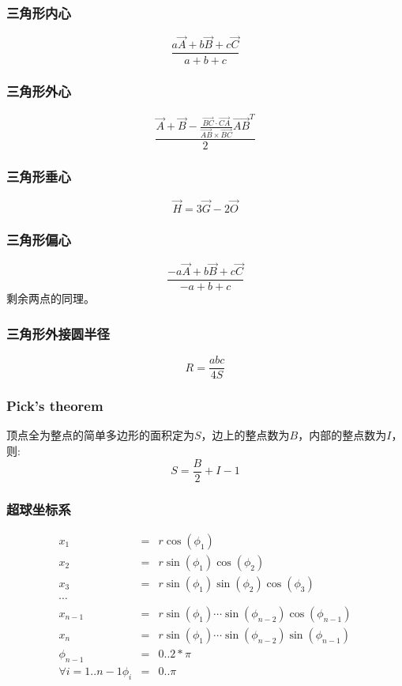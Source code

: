 \subsubsection{三角形内心}
	\[ \frac{a\vec {A} + b\vec{B} + c\vec{C}}{a + b + c} \]
\subsubsection{三角形外心}
	\[ \frac{\vec{A} + \vec{B} - \frac{\overrightarrow {BC} \cdot \overrightarrow{CA}}{\overrightarrow {AB} \times \overrightarrow{BC}}\overrightarrow {AB}^T}{2} \]
\subsubsection{三角形垂心}
	\[ \vec{H} = 3\vec{G} - 2\vec{O} \]
\subsubsection{三角形偏心}
	\[ \frac{-a\vec {A} + b\vec{B} + c\vec{C}}{-a + b + c} \]
	剩余两点的同理。
\subsubsection{三角形外接圆半径}
	\[ R = \frac{abc}{4S} \]
\subsubsection{Pick's theorem}
	顶点全为整点的简单多边形的面积定为$S$，边上的整点数为$B$，内部的整点数为$I$，则:
	\[ S = \frac{B}{2} + I - 1 \]
\subsubsection{超球坐标系}
\begin{eqnarray*}
 	x_1 &=& r\cos(\phi_1) \\ 
	x_2 &=& r\sin(\phi_1)\cos(\phi_2) \\
	x_3 &=& r\sin(\phi_1)\sin(\phi_2)\cos(\phi_3) \\
	\cdots\\
	x_{n-1} &=& r\sin(\phi_1)\cdots\sin(\phi_{n-2})\cos(\phi_{n-1}) \\
	x_n &=& r\sin(\phi_1)\cdots\sin(\phi_{n-2})\sin(\phi_{n-1}) \\
	\phi_{n-1} &=& 0..2*\pi\\
	\forall {i=1..{n-1}}\phi_i &=& 0..\pi\\
\end{eqnarray*}
